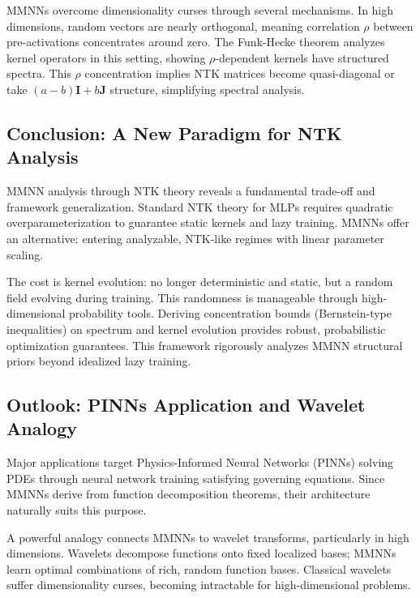 \documentclass[a4paper]{article}
\theoremstyle{plain}
\theoremstyle{definition}
\theoremstyle{remark}
\begin{document}
\begin{tcolorbox}[colback=green!5,colframe=green!80!black,title={\textbf{Remark: High-Dimensional Advantages}},enhanced,drop shadow,boxrule=2pt]
MMNNs overcome dimensionality curses through several mechanisms. In high dimensions, random vectors are nearly orthogonal, meaning correlation $\rho$ between pre-activations concentrates around zero. The Funk-Hecke theorem analyzes kernel operators in this setting, showing $\rho$-dependent kernels have structured spectra. This $\rho$ concentration implies NTK matrices become quasi-diagonal or take $(a-b)\mathbf{I} + b\mathbf{J}$ structure, simplifying spectral analysis.
\end{tcolorbox}




\subsection{Conclusion: A New Paradigm for NTK Analysis}
MMNN analysis through NTK theory reveals a fundamental trade-off and framework generalization. Standard NTK theory for MLPs requires quadratic overparameterization to guarantee static kernels and lazy training. MMNNs offer an alternative: entering analyzable, NTK-like regimes with linear parameter scaling.

The cost is kernel evolution: no longer deterministic and static, but a random field evolving during training. This randomness is manageable through high-dimensional probability tools. Deriving concentration bounds (Bernstein-type inequalities) on spectrum and kernel evolution provides robust, probabilistic optimization guarantees. This framework rigorously analyzes MMNN structural priors beyond idealized lazy training.

\subsection{Outlook: PINNs Application and Wavelet Analogy}
Major applications target Physics-Informed Neural Networks (PINNs) solving PDEs through neural network training satisfying governing equations. Since MMNNs derive from function decomposition theorems, their architecture naturally suits this purpose.

A powerful analogy connects MMNNs to wavelet transforms, particularly in high dimensions. Wavelets decompose functions onto fixed localized bases; MMNNs learn optimal combinations of rich, random function bases. Classical wavelets suffer dimensionality curses, becoming intractable for high-dimensional problems.
\end{document}
